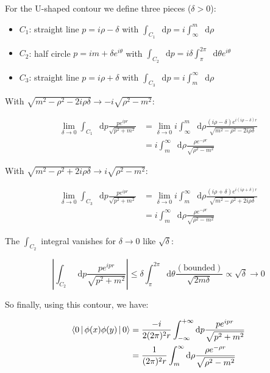 \documentclass[aspectratio=169]{beamer}
\newcommand{\integrand}{\frac{p e^{ipr}}{\sqrt{p^2 + m^2}}}
\newcommand{\diffop}{\mathop{}\!\mathrm{d}}
\newcommand{\dip}{\diffop p}
\newcommand{\drho}{\diffop \rho}
\newcommand{\dtheta}{\diffop \theta}
\newcommand{\phixy}{\Braket{0|\phi(x)\phi(y)|0}}
\newcommand{\intii}{\int_{-\infty}^{+\infty}}
\newcommand{\limdel}{\lim_{\delta \to 0}}
\newcommand{\integral}{\intii \dip \integrand}
\begin{document}
\begin{frame}
For the U-shaped contour we define three pieces ($\delta > 0$):
\begin{itemize}
\item $C_1$: straight line $p = i\rho - \delta$ with $\int_{C_1} \dip = i \int_\infty^m \drho$
\item $C_2$: half circle $p = im + \delta e^{i\theta}$ with $\int_{C_2} \dip = i\delta \int_\pi^{2\pi} \dtheta e^{i\theta}$
\item $C_3$: straight line $p = i\rho + \delta$ with $\int_{C_3} \dip = i \int_m^\infty \drho$
\end{itemize}
\end{frame}


\begin{frame}

With $\sqrt{m^2 - \rho^2 - 2i\rho\delta} \to -i \sqrt{\rho^2 - m^2}$:

\begin{equation*}
\begin{split}
\limdel \int_{C_1} \dip \integrand &= \limdel i \int_\infty^m \drho \frac{(i\rho - \delta)e^{i(i\rho - \delta)r}}{\sqrt{m^2 - \rho^2 - 2i\rho\delta}} \\
&= i \int_m^\infty \drho \frac{\rho e^{-\rho r}}{\sqrt{\rho^2 - m^2}}
\end{split}
\end{equation*}

With $\sqrt{m^2 - \rho^2 + 2i\rho\delta} \to i \sqrt{\rho^2 - m^2}$:

\begin{equation*}
\begin{split}
\limdel \int_{C_3} \dip \integrand &= \limdel i \int_m^\infty \drho \frac{(i\rho + \delta)e^{i(i\rho + \delta)r}}{\sqrt{m^2 - \rho^2 + 2i\rho\delta}} \\
&= i \int_m^\infty \drho \frac{\rho e^{-\rho r}}{\sqrt{\rho^2 - m^2}}
\end{split}
\end{equation*}
\end{frame}


\begin{frame}
The $\int_{C_2}$ integral vanishes for $\delta \to 0$ like $\sqrt{\delta}$:

\begin{equation*}
\left| \int_{C_2} \dip \integrand \right| \leq \delta \int_\pi^{2\pi} \dtheta
\frac{(\mathrm{bounded})}{\sqrt{2m\delta}} \propto \sqrt{\delta} \to 0
\end{equation*}

So finally, using this contour, we have:

\begin{equation*}
\begin{split}
\phixy &= \frac{-i}{2(2\pi)^2r} \integral \\
       &= \frac{1}{(2\pi)^2 r} \int_m^\infty \drho \frac{\rho e^{-\rho r}}{\sqrt{\rho^2 - m^2}}
\end{split}
\end{equation*}
\end{frame}
\end{document}
